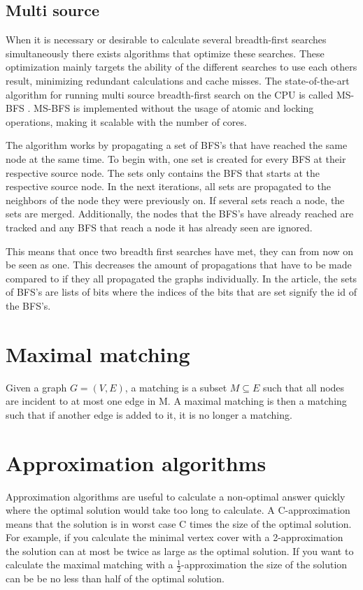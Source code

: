 \subsection{Multi source}
When it is necessary or desirable to calculate several breadth-first searches simultaneously there exists algorithms that optimize these searches. These optimization mainly targets the ability of the different searches to use each others result, minimizing redundant calculations and cache misses. The state-of-the-art algorithm for running multi source breadth-first search on the CPU is called MS-BFS \cite{msbfs}. MS-BFS is implemented without the usage of atomic and locking operations, making it scalable with the number of cores. 

The algorithm works by propagating a set of BFS's that have reached the same node at the same time. To begin with, one set is created for every BFS at their respective source node. The sets only contains the BFS that starts at the respective source node. In the next iterations, all sets are propagated to the neighbors of the node they were previously on. If several sets reach a node, the sets are merged. Additionally, the nodes that the BFS's have already reached are tracked and any BFS that reach a node it has already seen are ignored. 

This means that once two breadth first searches have met, they can from now on be seen as one. This decreases the amount of propagations that have to be made compared to if they all propagated the graphs individually. In the article, the sets of BFS's are lists of bits where the indices of the bits that are set signify the id of the BFS's.

\section{Maximal matching}
Given a graph $G = (V,E)$, a matching is a subset $M \subseteq E$ such that all nodes are incident to at most one edge in M. A maximal matching is then a matching such that if another edge is added to it, it is no longer a matching. 

\section{Approximation algorithms}
Approximation algorithms are useful to calculate a non-optimal answer quickly where the optimal solution would take too long to calculate. A C-approximation means that the solution is in worst case C times the size of the optimal solution. For example, if you calculate the minimal vertex cover with a 2-approximation the solution can at most be twice as large as the optimal solution. If you want to calculate the maximal matching with a $\frac{1}{2}$-approximation the size of the solution can be be no less than half of the optimal solution.

